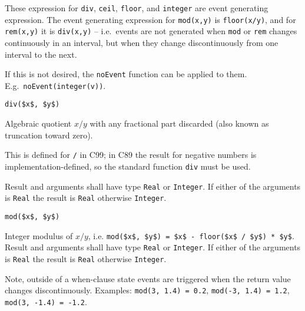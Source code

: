 These expression for \lstinline!div!, \lstinline!ceil!, \lstinline!floor!, and \lstinline!integer! are event generating expression.  The event generating expression for \lstinline!mod(x,y)! is \lstinline!floor(x/y)!, and for \lstinline!rem(x,y)! it is \lstinline!div(x,y)! -- i.e.\ events are not generated when \lstinline!mod! or \lstinline!rem! changes continuously in an interval, but when they change discontinuously from one interval to the next.

\begin{nonnormative}
If this is not desired, the \lstinline!noEvent! function can be applied to them.  E.g.\ \lstinline!noEvent(integer(v))!.
\end{nonnormative}

\begin{operatordefinition}[div]
\begin{synopsis}\begin{lstlisting}
div($x$, $y$)
\end{lstlisting}\end{synopsis}
\begin{semantics}
Algebraic quotient $x / y$ with any fractional part discarded (also known as truncation toward zero).
\begin{nonnormative}
This is defined for \lstinline!/! in C99; in C89 the result for negative numbers is implementation-defined, so the standard function \lstinline[language=C]!div! must be used.
\end{nonnormative}
Result and arguments shall have type \lstinline!Real! or \lstinline!Integer!.  If either of the arguments is \lstinline!Real! the result is \lstinline!Real! otherwise \lstinline!Integer!.
\end{semantics}
\end{operatordefinition}

\begin{operatordefinition}[mod]
\begin{synopsis}\begin{lstlisting}
mod($x$, $y$)
\end{lstlisting}\end{synopsis}
\begin{semantics}
Integer modulus of $x / y$, i.e. \lstinline!mod($x$, $y$) = $x$ - floor($x$ / $y$) * $y$!.  Result and arguments shall have type \lstinline!Real! or \lstinline!Integer!.  If either of the arguments is \lstinline!Real! the result is \lstinline!Real! otherwise \lstinline!Integer!.
\begin{nonnormative}
Note, outside of a when-clause state events are triggered when the return value changes discontinuously.  Examples: \lstinline!mod(3, 1.4) = 0.2!, \lstinline!mod(-3, 1.4) = 1.2!, \lstinline!mod(3, -1.4) = -1.2!.
\end{nonnormative}
\end{semantics}
\end{operatordefinition}

